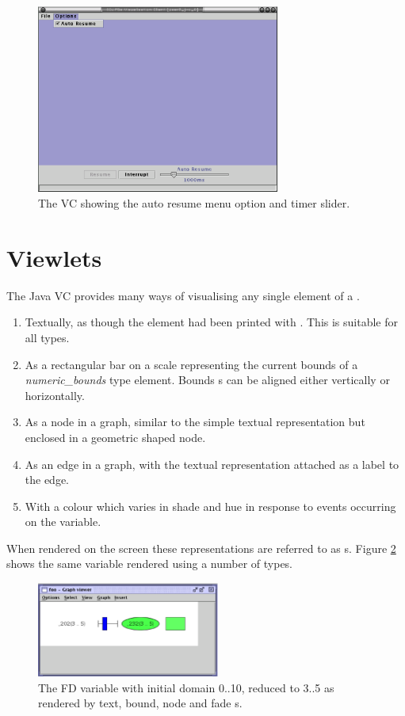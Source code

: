 \begin{figure}[htp]
\centering
\includegraphics[width=8cm]{vcautoresume}
\caption{The VC showing the auto resume menu option and timer slider.}
\label{fig:autoresume}
\end{figure}


\section{Viewlets}

The Java VC provides many ways of visualising any single element of a
\viewable{}.

\begin{enumerate}
\item Textually, as though the element had been printed with
.  This is
suitable for all \viewable{} types.
\item As a rectangular bar on a scale representing the current bounds
of a \emph{numeric_bounds} type \viewable{} element.  Bounds
\viewlet{}s can be aligned either vertically or horizontally.
\item As a node in a graph, similar to the simple textual
representation but enclosed in a geometric shaped node.
\item As an edge in a graph, with the textual representation attached
as a label to the edge.
\item With a colour which varies in shade and hue in response to
events occurring on the variable.
\end{enumerate}

When rendered on the screen these representations are referred to as
\viewlet{}s.  Figure \ref{fig:viewlets} shows the same variable
rendered using a number of \viewlet{} types.

\begin{figure}[htp]
\centering
\includegraphics[width=6cm]{vcviewlets}
\caption{The FD variable with initial domain 0..10, reduced to 3..5 as
rendered by text, bound, node and fade \viewlet{}s.}
\label{fig:viewlets}
\end{figure}


